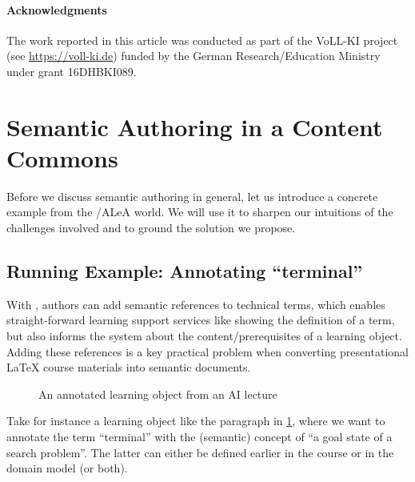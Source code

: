 \documentclass[runningheads]{llncs}
\newcommand\ALeA{\textsf{ALeA}\xspace}
\begin{document}
\paragraph{Acknowledgments}
The work reported in this article was conducted as part of the VoLL-KI project (see
\url{https://voll-ki.de}) funded by the German Research/Education Ministry under grant
16DHBKI089.

\section{Semantic Authoring in a Content Commons}\label{sec:semauth}

Before we discuss semantic authoring in general, let us introduce a concrete example from
the \sTeX/\ALeA world. We will use it to sharpen our intuitions of the challenges
involved and to ground the solution we propose.

\subsection{Running Example: Annotating ``terminal''}
With \sTeX, authors can add semantic references to technical terms,
which enables straight-forward learning support services like
showing the definition of a term, but also informs the system
about the content/prerequisites of a learning object.
Adding these references is a key practical problem when converting presentational {\LaTeX}
course materials into semantic documents.

\begin{figure}[ht]\centering
  \caption{An annotated learning object from an AI lecture}\label{fig:lo}
\end{figure}

Take for instance a learning object like the paragraph in \cref{fig:lo}, where we want to annotate
the term ``terminal'' with the (semantic) concept of ``a goal state of a search
problem''. The latter can either be defined earlier in the course or in the domain model
(or both).
\end{document}
